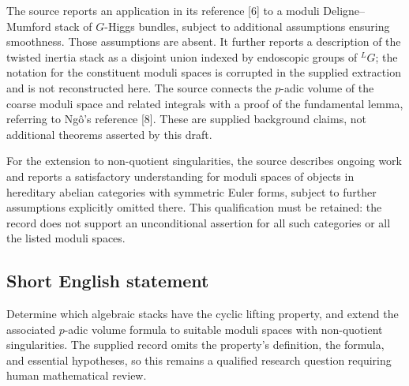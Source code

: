 \documentclass[11pt]{article}
\begin{document}
The source reports an application in its reference [6] to a moduli Deligne--Mumford stack of \(G\)-Higgs bundles, subject to additional assumptions ensuring smoothness. Those assumptions are absent. It further reports a description of the twisted inertia stack as a disjoint union indexed by endoscopic groups of \({}^{L}G\); the notation for the constituent moduli spaces is corrupted in the supplied extraction and is not reconstructed here. The source connects the \(p\)-adic volume of the coarse moduli space and related integrals with a proof of the fundamental lemma, referring to Ng\^o's reference [8]. These are supplied background claims, not additional theorems asserted by this draft.

For the extension to non-quotient singularities, the source describes ongoing work and reports a satisfactory understanding for moduli spaces of objects in hereditary abelian categories with symmetric Euler forms, subject to further assumptions explicitly omitted there. This qualification must be retained: the record does not support an unconditional assertion for all such categories or all the listed moduli spaces.
\subsection{Short English statement}
Determine which algebraic stacks have the cyclic lifting property, and extend the associated \(p\)-adic volume formula to suitable moduli spaces with non-quotient singularities. The supplied record omits the property's definition, the formula, and essential hypotheses, so this remains a qualified research question requiring human mathematical review.
\end{document}

